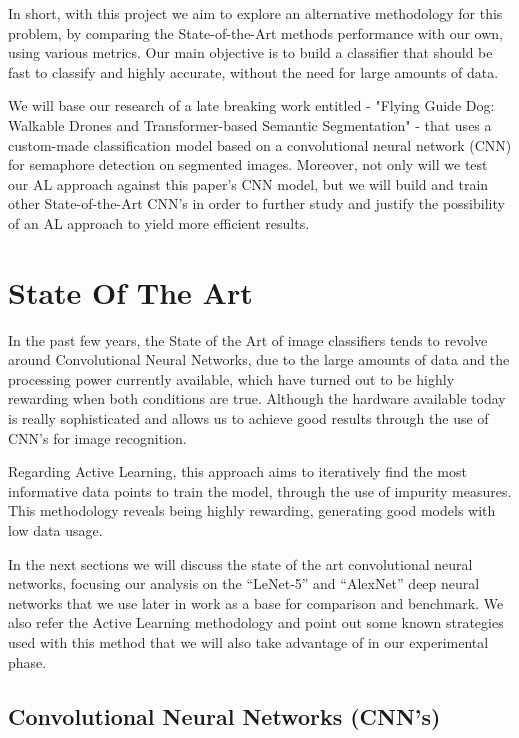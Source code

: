 \documentclass[journal, a4paper]{IEEEtran}
\begin{document}
In short, with this project we aim to explore an alternative methodology for 
this problem, by comparing the State-of-the-Art methods performance with our own, 
using various metrics. Our main objective is to build a classifier that should be 
fast to classify and highly accurate, without the need for large amounts of data.

We will base our research of a late breaking work entitled - "Flying Guide Dog: 
Walkable Drones and Transformer-based Semantic Segmentation" \cite{tan2021flying} 
- that uses a custom-made classification model based on a convolutional neural 
network (CNN) for semaphore detection on segmented images. Moreover, not only 
will we test our AL approach against this paper's CNN model, but we will build 
and train other State-of-the-Art CNN's in order to further study and justify 
the possibility of an AL approach to yield more efficient results.

\section{State Of The Art} \label{sota}

In the past few years, the State of the Art of image classifiers tends to revolve 
around Convolutional Neural Networks, due to the large amounts of data and
the processing power currently available, which have turned out to be highly 
rewarding when both conditions are true. Although the hardware available today
is really sophisticated and allows us to achieve good results through the use 
of CNN's for image recognition.

Regarding Active Learning, this approach aims to iteratively find the most 
informative data points to train the model, through the use of impurity measures. 
This methodology reveals being highly rewarding, generating good models with low 
data usage.

In the next sections we will discuss the state of the art convolutional neural
networks, focusing our analysis on the ``LeNet-5'' \cite{LeNet-5} and 
``AlexNet'' \cite{AlexNet} deep neural networks that we use later in work 
as a base for comparison and benchmark. We also refer the Active Learning 
methodology and point out some known strategies used with this method that 
we will also take advantage of in our experimental phase.

\subsection{Convolutional Neural Networks (CNN's)}
\end{document}
